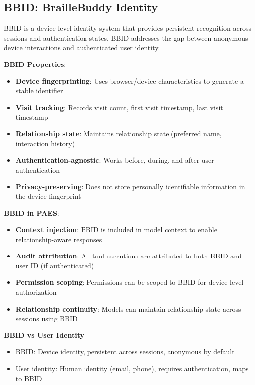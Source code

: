 \documentclass[11pt,a4paper]{article}
\begin{document}
\subsection{BBID: BrailleBuddy Identity}

BBID is a device-level identity system that provides persistent recognition across sessions and authentication states. BBID addresses the gap between anonymous device interactions and authenticated user identity.

\textbf{BBID Properties}:
\begin{itemize}
    \item \textbf{Device fingerprinting}: Uses browser/device characteristics to generate a stable identifier
    \item \textbf{Visit tracking}: Records visit count, first visit timestamp, last visit timestamp
    \item \textbf{Relationship state}: Maintains relationship state (preferred name, interaction history)
    \item \textbf{Authentication-agnostic}: Works before, during, and after user authentication
    \item \textbf{Privacy-preserving}: Does not store personally identifiable information in the device fingerprint
\end{itemize}

\textbf{BBID in PAES}:
\begin{itemize}
    \item \textbf{Context injection}: BBID is included in model context to enable relationship-aware responses
    \item \textbf{Audit attribution}: All tool executions are attributed to both BBID and user ID (if authenticated)
    \item \textbf{Permission scoping}: Permissions can be scoped to BBID for device-level authorization
    \item \textbf{Relationship continuity}: Models can maintain relationship state across sessions using BBID
\end{itemize}

\textbf{BBID vs User Identity}:
\begin{itemize}
    \item BBID: Device identity, persistent across sessions, anonymous by default
    \item User identity: Human identity (email, phone), requires authentication, maps to BBID
\end{itemize}
\end{document}
